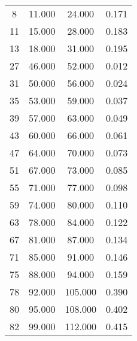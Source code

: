 % 
\begin{tabular}{cccc}
  \hline
  \hline
8 & 11.000 & 24.000 & 0.171 \\ 
  11 & 15.000 & 28.000 & 0.183 \\ 
  13 & 18.000 & 31.000 & 0.195 \\ 
  27 & 46.000 & 52.000 & 0.012 \\ 
  31 & 50.000 & 56.000 & 0.024 \\ 
  35 & 53.000 & 59.000 & 0.037 \\ 
  39 & 57.000 & 63.000 & 0.049 \\ 
  43 & 60.000 & 66.000 & 0.061 \\ 
  47 & 64.000 & 70.000 & 0.073 \\ 
  51 & 67.000 & 73.000 & 0.085 \\ 
  55 & 71.000 & 77.000 & 0.098 \\ 
  59 & 74.000 & 80.000 & 0.110 \\ 
  63 & 78.000 & 84.000 & 0.122 \\ 
  67 & 81.000 & 87.000 & 0.134 \\ 
  71 & 85.000 & 91.000 & 0.146 \\ 
  75 & 88.000 & 94.000 & 0.159 \\ 
  78 & 92.000 & 105.000 & 0.390 \\ 
  80 & 95.000 & 108.000 & 0.402 \\ 
  82 & 99.000 & 112.000 & 0.415 \\ 
   \hline
\end{tabular}
